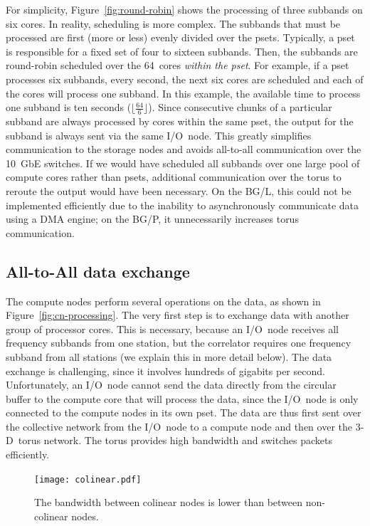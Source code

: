 \documentclass{sig-alternate}
\begin{document}
For simplicity, Figure~\ref{fig:round-robin} shows the processing of
three subbands on six cores.
In reality, scheduling is more complex.
The subbands that must be processed are first (more or less) evenly divided
over the psets.
Typically, a pset is responsible for a fixed set of four to sixteen subbands.
Then, the subbands are round-robin scheduled over the 64~cores \emph{within the
pset}.
For example, if a pset processes six subbands, every second, the next six
cores are scheduled and each of the cores will process one subband.
In this example, the available time to process one subband is ten seconds
($\lfloor\frac{64}{6}\rfloor$).
Since consecutive chunks of a particular subband are always processed by cores
within the same pset, the output for the subband is always sent via the same
I/O~node.
This greatly simplifies communication to the storage nodes and avoids
all-to-all communication over the 10~GbE switches.
If we would have scheduled all subbands over one large pool of compute cores
rather than psets, additional communication over the torus to reroute the
output would have been necessary.
On the BG/L, this could not be implemented efficiently due to the
inability to asynchronously communicate data using a DMA engine; on the
BG/P, it unnecessarily increases torus communication.


\subsection{All-to-All data exchange}

The compute nodes perform several operations on the data, as shown in
Figure~\ref{fig:cn-processing}.
The very first step is to exchange data with another group of processor cores.
This is necessary, because an I/O~node receives all frequency subbands from one
station, but the correlator requires one frequency subband from all
stations (we explain this in more detail below).
The data exchange is challenging, since it involves hundreds of gigabits per
second.
Unfortunately, an I/O~node cannot send the data directly from the circular
buffer to the compute core that will process the data, since the I/O~node is
only connected to the compute nodes in its own pset.
The data are thus first sent over the collective network from the I/O~node to
a compute node and then over the 3-D~torus network.
The torus provides high bandwidth and switches packets efficiently.

\begin{figure}[ht]
\begin{center}
\texttt{[image: colinear.pdf]}
\end{center}
\caption{The bandwidth between colinear nodes is lower than between
non-colinear nodes.}
\label{fig:colinear}
\end{figure}
\end{document}
